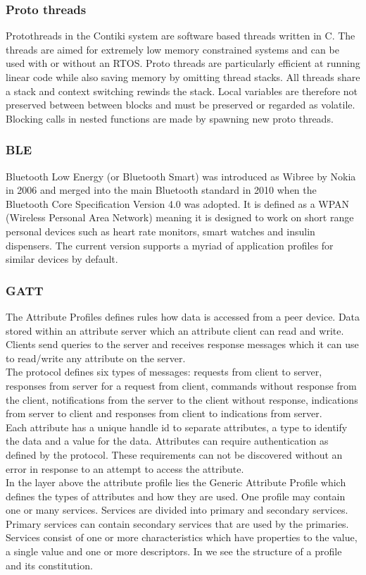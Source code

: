 \documentclass{article}
\begin{document}
\subsubsection{Proto threads}
Protothreads in the Contiki system are software based threads written in C. The threads are aimed for extremely low memory constrained systems and can be used with or without an RTOS. \cite{proto} Proto threads are particularly efficient at running linear code while also saving memory by omitting thread stacks. All threads share a stack and context switching rewinds the stack. Local variables are therefore not preserved between between blocks and must be preserved or regarded as volatile.
Blocking calls in nested functions are made by spawning new proto threads.


\subsubsection{BLE}
Bluetooth Low Energy (or Bluetooth Smart) was introduced as Wibree by Nokia in 2006 \cite{wibree} and merged into the main Bluetooth standard in 2010 when the Bluetooth Core Specification Version 4.0 was adopted. It is defined as a WPAN (Wireless Personal Area Network) meaning it is designed to work on short range personal devices such as heart rate monitors, smart watches and insulin dispensers. The current version supports a myriad of application profiles for similar devices by default.

\subsubsection{GATT}
The Attribute Profiles defines rules how data is accessed from a peer device.\cite{blehandbook} Data stored within an attribute server which an attribute client can read and write. Clients send queries to the server and receives response messages which it can use to read/write any attribute on the server.\\
The protocol defines six types of messages: requests from client to server, responses from server for a request from client, commands without response from the client, notifications from the server to the client without response, indications from server to client and responses from client to indications from server.\\
Each attribute has a unique handle id to separate attributes, a type to identify the data and a value for the data. Attributes can require authentication as defined by the protocol. These requirements can not be discovered without an error in response to an attempt to access the attribute.\\
In the layer above the attribute profile lies the Generic Attribute Profile which defines the types of attributes and how they are used. One profile may contain one or many services. Services are divided into primary and secondary services. Primary services can contain secondary services that are used by the primaries. Services consist of one or more characteristics which have properties to the value, a single value and one or more descriptors. In \pageref{fig:gatt} we see the structure of a profile and its constitution.\\
\end{document}
